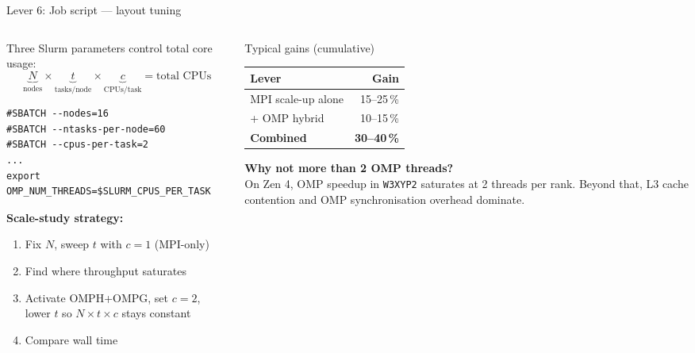 \documentclass[aspectratio=169,10pt]{beamer}
\begin{document}
\begin{frame}[fragile,shrink=15]{Lever 6: Job script --- layout tuning}

  \begin{columns}[T]
    \begin{column}{0.54\textwidth}
      Three Slurm parameters control total core usage:
      \[
        \underbrace{N}_{\text{nodes}}
        \times
        \underbrace{t}_{\text{tasks/node}}
        \times
        \underbrace{c}_{\text{CPUs/task}}
        = \text{total CPUs}
      \]
\begin{lstlisting}[language={}]
#SBATCH --nodes=16
#SBATCH --ntasks-per-node=60
#SBATCH --cpus-per-task=2
...
export OMP_NUM_THREADS=$SLURM_CPUS_PER_TASK
\end{lstlisting}

      \vspace{0.3em}
      \textbf{Scale-study strategy:}
      \begin{enumerate}\small
        \item Fix $N$, sweep $t$ with $c=1$ (MPI-only)
        \item Find where throughput saturates
        \item Activate OMPH+OMPG, set $c=2$,
              lower $t$ so $N\!\times\!t\!\times\!c$ stays constant
        \item Compare wall time
      \end{enumerate}
    \end{column}
    \begin{column}{0.42\textwidth}
      \vspace{0.5em}
      \begin{block}{Typical gains (cumulative)}
        \begin{tabular}{lr}
          \toprule
          Lever & Gain \\
          \midrule
          MPI scale-up alone    & 15--25\,\% \\
          + OMP hybrid          & 10--15\,\% \\
          \textbf{Combined}     & \textbf{30--40\,\%} \\
          \bottomrule
        \end{tabular}
      \end{block}

      \vspace{0.6em}
      \textbf{Why not more than 2 OMP threads?}\\[3pt]
      On Zen 4, OMP speedup in \texttt{W3XYP2} saturates at
      2 threads per rank. Beyond that, L3 cache contention and OMP
      synchronisation overhead dominate.
    \end{column}
  \end{columns}
\end{frame}
\end{document}
